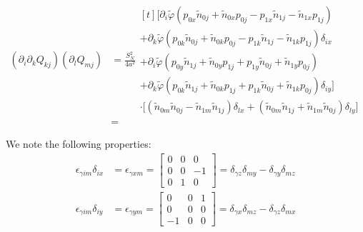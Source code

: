 \documentclass[reqno]{article}
\newcommand{\phitilde}{\tilde{\varphi}}
\begin{document}
\begin{equation}
\begin{split}
    \left( \partial_i \partial_k Q_{k j} \right) \left( \partial_l Q_{m j} \right)
    &=
    \frac{S_N^2}{4 a^2}
    \begin{multlined}[t]
    \biggl[
         \partial_i \phitilde \left( p_{0x} \tilde{n}_{0j} + \tilde{n}_{0x} p_{0j} - p_{1x} \tilde{n}_{1j} - \tilde{n}_{1x} p_{1j} \right) \\
        + \partial_k \phitilde \left( 
            p_{0k} \tilde{n}_{0j} + \tilde{n}_{0k} p_{0j} - p_{1k} \tilde{n}_{1j} - \tilde{n}_{1k} p_{1j}
        \right) \delta_{ix} \\
        + \partial_i \phitilde \left( 
            p_{0y} \tilde{n}_{1j} + \tilde{n}_{0y} p_{1j} + p_{1y} \tilde{n}_{0j} + \tilde{n}_{1y} p_{0j}
        \right) \\
        + \partial_k \phitilde  \left( 
            p_{0k} \tilde{n}_{1j} + \tilde{n}_{0k} p_{1j} + p_{1k} \tilde{n}_{0j} + \tilde{n}_{1k} p_{0j}
        \right) \delta_{i y}
    \biggr] \\
    \cdot 
    \bigl[
        \left( \tilde{n}_{0m} \tilde{n}_{0j} - \tilde{n}_{1m} \tilde{n}_{1j} \right)\delta_{l x} 
        + \left( \tilde{n}_{0m} \tilde{n}_{1j} + \tilde{n}_{1m} \tilde{n}_{0j} \right) \delta_{l y}
    \bigr]
    \end{multlined} \\
    &=
\end{split}
\end{equation}

We note the following properties:
\begin{equation}
\begin{split}
    \epsilon_{\gamma i m} \delta_{i x}
    &=
    \epsilon_{\gamma x m}
    =
    \begin{bmatrix}
        0 &0 &0 \\
        0 &0 &-1 \\
        0 &1 &0
    \end{bmatrix} 
    =
    \delta_{\gamma z} \delta_{m y}
    - \delta_{\gamma y} \delta_{m z} \\
    \epsilon_{\gamma i m} \delta_{i y}
    &=
    \epsilon_{\gamma y m}
    =
    \begin{bmatrix}
        0 &0 &1 \\
        0 &0 &0 \\
        -1 &0 &0
    \end{bmatrix}
    =
    \delta_{\gamma x} \delta_{m z}
    - \delta_{\gamma z} \delta_{m x}
\end{split}
\end{equation}
\end{document}
